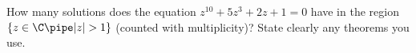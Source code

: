 How many solutions does the equation $z^{10}+5z^3+2z+1=0$ have in the
region $\{z\in \C \pipe |z|>1\}$ (counted with multiplicity)? State
clearly any theorems you use.
